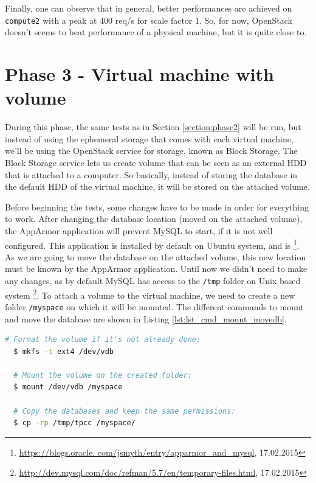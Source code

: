 Finally, one can observe that in general, better performances are achieved on \texttt{compute2} with a peak at 400 req/s for scale factor 1.
So, for now, OpenStack doesn't seems to beat performance of a physical machine, but it is quite close to.






\section{Phase 3 - Virtual machine with volume}

During this phase, the same tests as in Section \ref{section:phase2} will be run, but instead of using the ephemeral storage that comes with each virtual machine, we'll be using the OpenStack service for storage, known as Block Storage. The Block Storage service lets us create volume that can be seen as an external HDD that is attached to a computer. So basically, instead of storing the database in the default HDD of the virtual machine, it will be stored on the attached volume.

Before beginning the tests, some changes have to be made in order for everything to work. 
After changing the database location (moved on the attached volume), the AppArmor application will prevent MySQL to start, if it is not well configured. 
This application is installed by default on Ubuntu system, and is 
\footnote{\url{https://blogs.oracle.
com/jsmyth/entry/apparmor_and_mysql}, 17.02.2015}. 
As we are going to move the database on the attached volume, this new location must be known by the AppArmor application. 
Until now we didn't need to make any changes, as by default MySQL has access to the \texttt{/tmp} folder on Unix based system
\footnote{\url{http://dev.mysql.com/doc/refman/5.7/en/temporary-files.html}, 17.02.2015}. 
To attach a volume to the virtual machine, we need to create a new folder \texttt{/myspace} on which it will be mounted. 
The different commands to mount and move the database are shown in Listing \ref{lst:lst_cmd_mount_movedb}.

{
\singlespacing
\begin{lstlisting}[frame=single,language=bash,caption={Mount volume and move database},label={lst:lst_cmd_mount_movedb}]
  # Format the volume if it's not already done:
  $ mkfs -t ext4 /dev/vdb

  # Mount the volume on the created folder:
  $ mount /dev/vdb /myspace

  # Copy the databases and keep the same permissions:
  $ cp -rp /tmp/tpcc /myspace/
\end{lstlisting}
}


